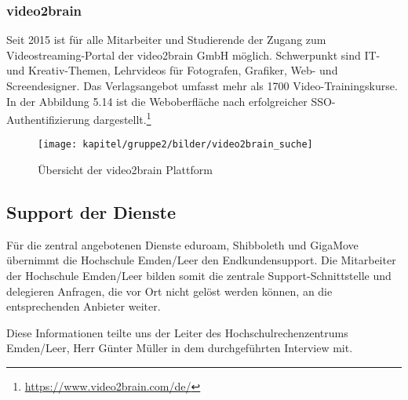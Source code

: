 \subsubsection{video2brain}
Seit 2015 ist für alle Mitarbeiter und Studierende der Zugang zum Videostreaming-Portal der video2brain GmbH möglich. Schwerpunkt sind IT- und Kreativ-Themen, Lehrvideos für Fotografen, Grafiker, Web- und Screendesigner. Das Verlagsangebot umfasst mehr als 1700 Video-Trainingskurse. In der Abbildung 5.14 ist die Weboberfläche nach erfolgreicher SSO-Authentifizierung dargestellt.\footnote{\url{https://www.video2brain.com/de/}}

\begin{figure}[h!]
	\centering
	\texttt{[image: kapitel/gruppe2/bilder/video2brain\_suche]}
	\caption{Übersicht der video2brain Plattform}
	\label{fig_video2brain_suchergebnis}
\end{figure}

\subsection{Support der Dienste}
Für die zentral angebotenen Dienste eduroam, Shibboleth und GigaMove übernimmt die Hochschule Emden/Leer den Endkundensupport. Die Mitarbeiter der Hochschule Emden/Leer bilden somit die zentrale Support-Schnittstelle und delegieren Anfragen, die vor Ort nicht gelöst werden können, an die entsprechenden Anbieter weiter.

Diese Informationen teilte uns der Leiter des Hochschulrechenzentrums Emden/Leer, Herr Günter Müller in dem durchgeführten Interview mit.